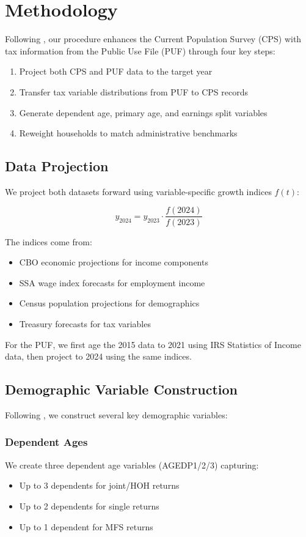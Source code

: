 \section{Methodology}\label{sec:methodology}

Following \cite{bryant2023a}, our procedure enhances the Current Population Survey (CPS) with tax information from the Public Use File (PUF) through four key steps:
\begin{enumerate}
    \item Project both CPS and PUF data to the target year
    \item Transfer tax variable distributions from PUF to CPS records
    \item Generate dependent age, primary age, and earnings split variables
    \item Reweight households to match administrative benchmarks
\end{enumerate}

\subsection{Data Projection}

We project both datasets forward using variable-specific growth indices $f(t)$:

\[ y_{2024} = y_{2023} \cdot \frac{f(2024)}{f(2023)} \]

The indices come from:
\begin{itemize}
    \item CBO economic projections for income components
    \item SSA wage index forecasts for employment income
    \item Census population projections for demographics
    \item Treasury forecasts for tax variables
\end{itemize}

For the PUF, we first age the 2015 data to 2021 using IRS Statistics of Income data, then project to 2024 using the same indices.

\subsection{Demographic Variable Construction}

Following \cite{bryant2023b}, we construct several key demographic variables:

\subsubsection{Dependent Ages}
We create three dependent age variables (AGEDP1/2/3) capturing:
\begin{itemize}
    \item Up to 3 dependents for joint/HOH returns
    \item Up to 2 dependents for single returns 
    \item Up to 1 dependent for MFS returns
\end{itemize}

